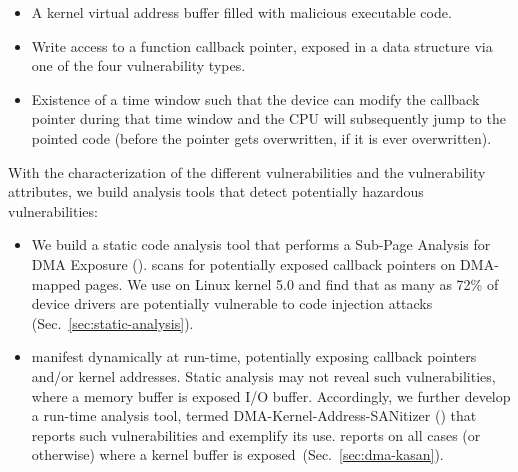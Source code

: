 \begin{itemize}
    \item A kernel virtual address \DIFdelbegin {}\DIFdelend \DIFaddbegin {}\DIFaddend buffer filled with malicious executable code\DIFdelbegin {}\DIFdelend \DIFaddbegin {}\DIFaddend \mabaf\DIFaddbegin \DIFadd{)}\DIFaddend .
    \item Write access to a function callback pointer, exposed in a data structure via one of the four \subpage vulnerability types. 
    \item Existence of a time window such that the device can modify the callback pointer during that time window and the CPU will subsequently jump to the pointed code (before the pointer gets overwritten, if it is ever overwritten). 
\end{itemize} 

With the characterization of the different \subpage{} vulnerabilities and the vulnerability attributes, we build analysis tools that detect potentially hazardous \subpage{} vulnerabilities:

\begin{itemize}
    \item We build a static code analysis tool that performs a Sub-Page Analysis for DMA Exposure (\tool). \tool scans for potentially exposed callback pointers on DMA-mapped pages. We use \tool on Linux kernel 5.0 and find that as many as 72\% of device drivers are potentially vulnerable to code injection attacks (Sec.~\ref{sec:static-analysis}). 

    \item \DIFdelbegin %
\DIFdelend \DIFaddbegin {}\subpage{} \DIFaddend manifest dynamically at run-time, potentially exposing callback pointers and/or kernel addresses. Static analysis may not reveal such vulnerabilities, where a memory buffer is exposed \DIFdelbegin {}\DIFdelend \DIFaddbegin {}\DIFaddend I/O buffer. Accordingly, we further develop a run-time analysis tool, termed DMA-Kernel-Address-SANitizer (\dkasan) that reports such vulnerabilities and exemplify its use. \dkasan reports on all cases (\DIFdelbegin {}\DIFdelend \DIFaddbegin {}\DIFaddend or otherwise) where a kernel buffer is exposed~(Sec.~\ref{sec:dma-kasan}).
\end{itemize}

